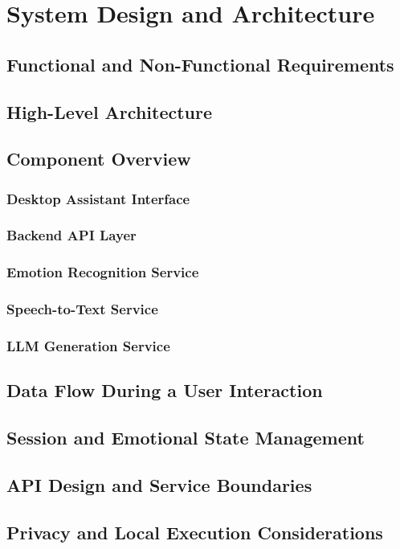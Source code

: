 \chapter{System Design and Architecture}

\section{Functional and Non-Functional Requirements}

\section{High-Level Architecture}

\section{Component Overview}

\subsection{Desktop Assistant Interface}

\subsection{Backend API Layer}

\subsection{Emotion Recognition Service}

\subsection{Speech-to-Text Service}

\subsection{LLM Generation Service}

\section{Data Flow During a User Interaction}

\section{Session and Emotional State Management}

\section{API Design and Service Boundaries}

\section{Privacy and Local Execution Considerations}
